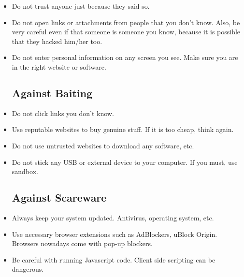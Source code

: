 \documentclass[12pt]{article}
\begin{document}
\begin{itemize}[itemsep=3em]
	\item Do not trust anyone just because they said so. 
	
	\item Do not open links or attachments from people that you don't know. Also, be very careful even if that someone is someone you know, because it is possible that they hacked him/her too.
	
	\item Do not enter personal information on any screen you see. Make sure you are in the right website or software.
	
	\subsection{Against Baiting}
	
	\item Do not click links you don't know. 
	\item Use reputable websites to buy genuine stuff. If it is too cheap, think again.
	\item Do not use untrusted websites to download any software, etc.
	\item Do not stick any USB or external device to your computer. If you must, use sandbox.
	
	\subsection{Against Scareware}
	
	\item Always keep your system updated. Antivirus, operating system, etc.
	\item Use necessary browser extensions such as AdBlockers, uBlock Origin. Browsers nowadays come with pop-up blockers.
	\item Be careful with running Javascript code. Client side scripting can be dangerous.


	
\end{itemize}	
	
	
\end{document}
